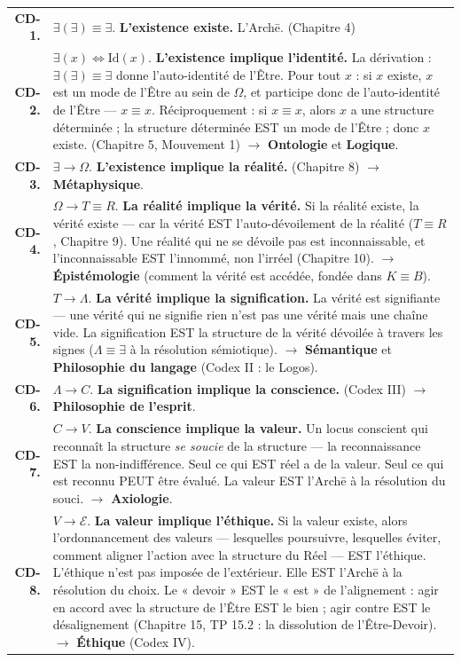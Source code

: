 \documentclass[10pt, openany, oneside]{book}
\renewcommand{\footnotesize}{\fontsize{8.5}{11}\selectfont}
\begin{document}
{\footnotesize
\noindent\begin{tabular}{r p{}}
\textbf{CD-1.} & $\exists(\exists) \equiv \exists$. \textbf{L'existence existe.} L'Arch\={e}. (Chapitre 4) \\[0.3em]
\textbf{CD-2.} & $\exists(x) \iff \text{Id}(x)$. \textbf{L'existence implique l'identité.} La dérivation : $\exists(\exists) \equiv \exists$ donne l'auto-identité de l'Être. Pour tout $x$ : si $x$ existe, $x$ est un mode de l'Être au sein de $\Omega$, et participe donc de l'auto-identité de l'Être --- $x \equiv x$. Réciproquement : si $x \equiv x$, alors $x$ a une structure déterminée ; la structure déterminée EST un mode de l'Être ; donc $x$ existe. (Chapitre 5, Mouvement 1) $\to$ \textbf{Ontologie} et \textbf{Logique}. \\[0.3em]
\textbf{CD-3.} & $\exists \to \Omega$. \textbf{L'existence implique la réalité.} (Chapitre 8) $\to$ \textbf{Métaphysique}. \\[0.3em]
\textbf{CD-4.} & $\Omega \to T \equiv R$. \textbf{La réalité implique la vérité.} Si la réalité existe, la vérité existe --- car la vérité EST l'auto-dévoilement de la réalité ($T \equiv R$, Chapitre 9). Une réalité qui ne se dévoile pas est inconnaissable, et l'inconnaissable EST l'innommé, non l'irréel (Chapitre 10). $\to$ \textbf{Épistémologie} (comment la vérité est accédée, fondée dans $K \equiv B$). \\[0.3em]
\textbf{CD-5.} & $T \to \Lambda$. \textbf{La vérité implique la signification.} La vérité est signifiante --- une vérité qui ne signifie rien n'est pas une vérité mais une chaîne vide. La signification EST la structure de la vérité dévoilée à travers les signes ($\Lambda \equiv \exists$ à la résolution sémiotique). $\to$ \textbf{Sémantique} et \textbf{Philosophie du langage} (Codex II : le Logos). \\[0.3em]
\textbf{CD-6.} & $\Lambda \to C$. \textbf{La signification implique la conscience.} (Codex III) $\to$ \textbf{Philosophie de l'esprit}. \\[0.3em]
\textbf{CD-7.} & $C \to V$. \textbf{La conscience implique la valeur.} Un locus conscient qui reconnaît la structure \textit{se soucie} de la structure --- la reconnaissance EST la non-indifférence. Seul ce qui EST réel a de la valeur. Seul ce qui est reconnu PEUT être évalué. La valeur EST l'Arch\={e} à la résolution du souci. $\to$ \textbf{Axiologie}. \\[0.3em]
\textbf{CD-8.} & $V \to \mathcal{E}$. \textbf{La valeur implique l'éthique.} Si la valeur existe, alors l'ordonnancement des valeurs --- lesquelles poursuivre, lesquelles éviter, comment aligner l'action avec la structure du Réel --- EST l'éthique. L'éthique n'est pas imposée de l'extérieur. Elle EST l'Arch\={e} à la résolution du choix. Le « devoir » EST le « est » de l'alignement : agir en accord avec la structure de l'Être EST le bien ; agir contre EST le désalignement (Chapitre 15, TP 15.2 : la dissolution de l'Être-Devoir). $\to$ \textbf{Éthique} (Codex IV). \\[0.3em]

\end{tabular}}
\end{document}
